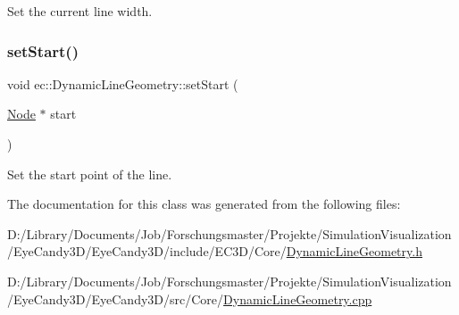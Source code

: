 Set the current line width. 

\mbox{\label{classec_1_1_dynamic_line_geometry_a7354615fc961c1d6d6e9ec09bdb5bdf9}} 
\subsubsection{\texorpdfstring{set\+Start()}{setStart()}}
{\footnotesize\ttfamily void ec\+::\+Dynamic\+Line\+Geometry\+::set\+Start (\begin{DoxyParamCaption}\item[{\mbox{\hyperlink{classec_1_1_node}{Node}} $\ast$}]{start }\end{DoxyParamCaption})}



Set the start point of the line. 



The documentation for this class was generated from the following files\+:\begin{DoxyCompactItemize}
\item 
D\+:/\+Library/\+Documents/\+Job/\+Forschungsmaster/\+Projekte/\+Simulation\+Visualization/\+Eye\+Candy3\+D/\+Eye\+Candy3\+D/include/\+E\+C3\+D/\+Core/\mbox{\hyperlink{_dynamic_line_geometry_8h}{Dynamic\+Line\+Geometry.\+h}}\item 
D\+:/\+Library/\+Documents/\+Job/\+Forschungsmaster/\+Projekte/\+Simulation\+Visualization/\+Eye\+Candy3\+D/\+Eye\+Candy3\+D/src/\+Core/\mbox{\hyperlink{_dynamic_line_geometry_8cpp}{Dynamic\+Line\+Geometry.\+cpp}}\end{DoxyCompactItemize}
